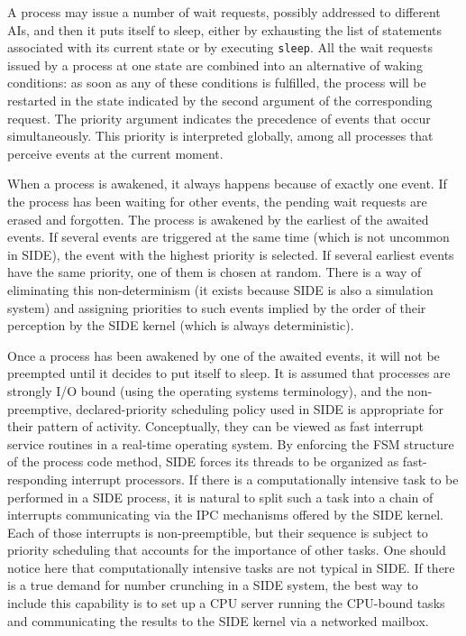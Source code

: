 A process may issue a number of wait requests, possibly addressed to
different AIs, and then it puts itself to sleep,
either by exhausting the list
of statements associated with its current state or by executing {\tt sleep}.
All the wait requests issued by a process at one state are combined into
an alternative of waking conditions:
as soon as any of these conditions is fulfilled, the process will be
restarted in the state
indicated by the second argument of the corresponding request.
The priority argument indicates the precedence of events that
occur simultaneously.
This priority is interpreted globally, among all processes that perceive
events at the current moment.

When a process is awakened, it always happens because of exactly one event.
If the process has been waiting for other events, the pending wait requests
are erased and forgotten.
The process is awakened by the earliest of the awaited events.
If several events are triggered at the same time (which is not uncommon
in SIDE), the event with the highest priority is selected.
If several earliest events have the same priority, one of them is chosen
at random.
There is a way of eliminating this non-determinism (it exists because SIDE is
also a simulation system) and assigning priorities to such events
implied by the order of their perception by the SIDE kernel (which is always
deterministic).

Once a process has been awakened by one of the awaited events,
it will not be preempted until it decides to put itself to sleep.
It is assumed that processes are strongly I/O bound (using the operating
systems terminology), and the non-preemptive, declared-priority
scheduling policy used in SIDE is appropriate for their pattern of activity.
Conceptually, they can be viewed as fast interrupt service routines in a
real-time operating system.
By enforcing the FSM structure of the process code method, SIDE forces
its threads to be organized as fast-responding interrupt processors.
If there is a computationally intensive task to be performed in a SIDE
process, it is natural to split such a task
into a chain of interrupts communicating via the IPC mechanisms
offered by the SIDE kernel.
Each of those interrupts is non-preemptible, but their sequence is subject
to priority scheduling that accounts for the importance of other tasks.
One should notice here that
computationally intensive tasks are not typical in SIDE.
If there is a true demand for number crunching in a SIDE system, the best way
to include this capability is to set up a CPU server running the CPU-bound
tasks and communicating the results to the SIDE kernel via a networked mailbox.

